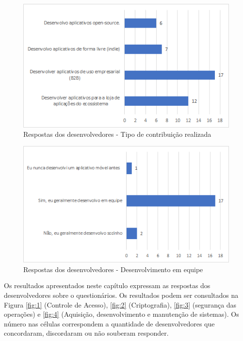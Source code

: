 \begin{figure}[H]
\centering
\includegraphics[scale=0.8]{fig/contribuicao.PNG}
\caption{Respostas dos desenvolvedores - Tipo de contribuição realizada}
\label{fig:contribuicao}
\end{figure}

\begin{figure}[H]
\vspace{1.8cm}
\centering
\includegraphics[scale=0.8]{fig/devjunto.png}
\caption{Respostas dos desenvolvedores - Desenvolvimento em equipe}
\label{fig:equipe}
\end{figure}

Os resultados apresentados neste capítulo expressam as respostas dos desenvolvedores sobre o questionários. Os resultados podem ser consultados na Figura \ref{fig:1} (Controle de Acesso), \ref{fig:2} (Criptografia), \ref{fig:3} (segurança das operações) e \ref{fig:4} (Aquisição, desenvolvimento e manutenção de sistemas). Os número nas células correspondem a quantidade de desenvolvedores que concordaram, discordaram ou não souberam responder.

